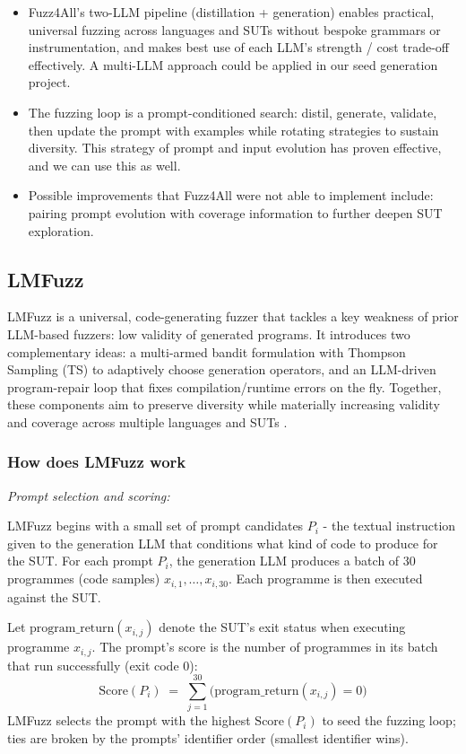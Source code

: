 \begin{itemize}
    \item Fuzz4All's two-LLM pipeline (distillation + generation) enables practical, universal fuzzing across languages and SUTs without bespoke grammars or instrumentation, and makes best use of each LLM's strength / cost trade-off effectively. A multi-LLM approach could be applied in our seed generation project. 
    \item The fuzzing loop is a prompt-conditioned search: distil, generate, validate, then update the prompt with examples while rotating strategies to sustain diversity. This strategy of prompt and input evolution has proven effective, and we can use this as well.
    \item Possible improvements that Fuzz4All were not able to implement include: pairing prompt evolution with coverage information to further deepen SUT exploration.
\end{itemize}




\subsection{LMFuzz}

LMFuzz is a universal, code-generating fuzzer that tackles a key weakness of prior LLM-based fuzzers: low validity of generated programs. It introduces two complementary ideas: a multi-armed bandit formulation with Thompson Sampling (TS) to adaptively choose generation operators, and an LLM-driven program-repair loop that fixes compilation/runtime errors on the fly. Together, these components aim to preserve diversity while materially increasing validity and coverage across multiple languages and SUTs \cite{lin_2025_lmfuzz}.

\subsubsection{How does LMFuzz work}

\lilspace
\textit{Prompt selection and scoring:}

LMFuzz begins with a small set of prompt candidates $P_i$ - the textual instruction given to the generation LLM that conditions what kind of code to produce for the SUT. For each prompt $P_i$, the generation LLM produces a batch of 30 programmes (code samples) $x_{i,1},\dots,x_{i,30}$. Each programme is then executed against the SUT.

Let $\text{program\_return}(x_{i,j})$ denote the SUT's exit status when executing programme $x_{i,j}$. The prompt's score is the number of programmes in its batch that run successfully (exit code 0):
\[
\text{Score}(P_i) \;=\; \sum_{j=1}^{30} \big(\text{program\_return}(x_{i,j}) = 0\big)
\]
LMFuzz selects the prompt with the highest $\text{Score}(P_i)$ to seed the fuzzing loop; ties are broken by the prompts' identifier order (smallest identifier wins).

